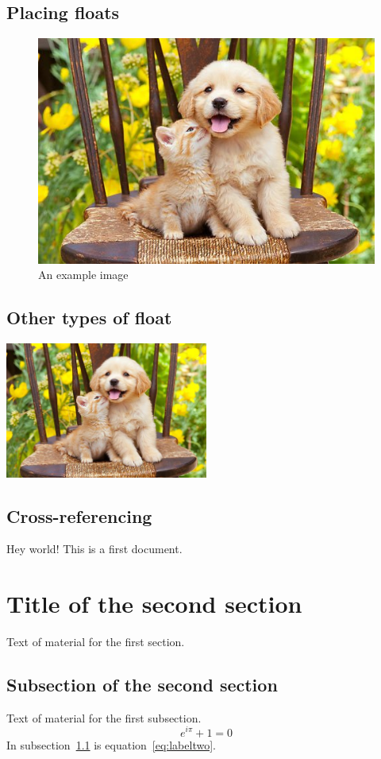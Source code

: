\documentclass{article}
\begin{document}
 \subsection{  Placing floats}

 \lipsum[1-7]
 \begin{figure}[H]
 \centering
 \includegraphics[width=0.7\linewidth]{pic}
 \caption{An example image}
 \end{figure}
 \lipsum[8-15]

 \subsection{Other types of float}

 \begin{image}
 \centering
 \includegraphics[width=0.5\textwidth]{pic}
 \caption{An example image}
 \end{image}

 \subsection{Cross-referencing}

 Hey world!
 This is a first document.
 \section{Title of the second section}
 Text of material for the first section.
 \subsection{Subsection of the second section}
 \label{subsec:labelone}
 Text of material for the first subsection.
 \begin{equation}
 e^{i\pi}+1 = 0
 \label{eq:labeltwo}
 \end{equation}
 In subsection~\ref{subsec:labelone} is
 equation~\ref{eq:labeltwo}.
\end{document}
